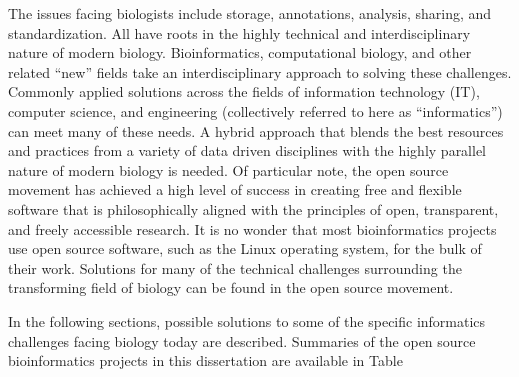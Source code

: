 The issues facing biologists include storage, annotations, analysis, sharing, and
standardization.  All have roots in the highly technical and interdisciplinary
nature of modern biology.  Bioinformatics, computational biology, and other
related ``new'' fields take an interdisciplinary approach to solving these
challenges.  Commonly applied solutions across the fields of information
technology (IT), computer science, and engineering (collectively referred to
here as ``informatics'') can meet many of these needs.  A hybrid
approach that blends the best resources and practices from a variety
of data driven disciplines with the highly parallel nature of modern biology is needed.
Of particular note, the open source movement has achieved a high level of
success in creating free and flexible software that is philosophically aligned
with the principles of open, transparent, and freely accessible research.  It
is no wonder that most bioinformatics projects use open source software, such
as the Linux operating system, for the bulk of their work.  Solutions for many
of the technical challenges surrounding the transforming field of biology can
be found in the open source movement.

In the following sections, possible solutions to some of the specific informatics
challenges facing biology today are described. Summaries of the open source
bioinformatics projects in this dissertation are available in Table %

